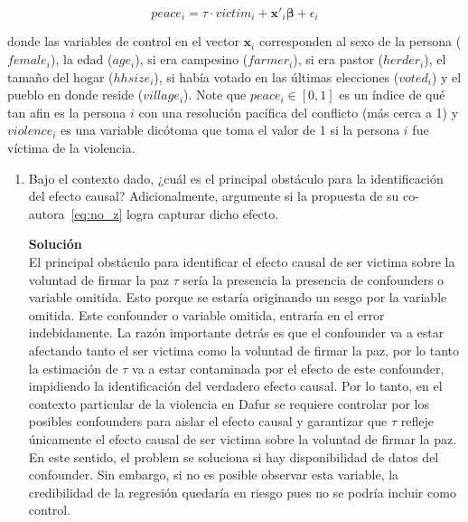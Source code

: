 \documentclass[a4paper, answers, addpoints, 11pt]{exam}
\begin{document}
\begin{equation}\label{eq:no_z}
    peace_i = \tau \cdot victim_i + \textbf{x}'_i\boldsymbol\beta + \epsilon_i
\end{equation}

    donde las variables de control en el vector $\textbf{x}_i$ corresponden al sexo de la persona ($female_i$), la edad ($age_i$), si era campesino ($farmer_i$), si era pastor ($herder_i$), el tamaño del hogar ($hhsize_i$), si había votado en las últimas elecciones ($voted_i$) y el pueblo en donde reside ($village_i$). Note que $peace_i \in [0,1]$ es un índice de qué tan afin es la persona $i$ con una resolución pacífica del conflicto (más cerca a 1) y $violence_i$ es una variable dicótoma que toma el valor de 1 si la persona $i$ fue víctima de la violencia.

\begin{enumerate}
    \item Bajo el contexto dado, ¿cuál es el principal obstáculo para la identificación del efecto causal? Adicionalmente, argumente si la propuesta de su co-autora~\eqref{eq:no_z} logra capturar dicho efecto.
    \begin{mdframed}
        \textbf{Solución}\\
        El principal obstáculo para identificar el efecto causal de ser victima sobre la voluntad de firmar la paz $\tau$ sería la presencia la presencia de confounders o variable omitida. Esto porque se estaría originando un sesgo por la variable omitida. Este confounder o variable omitida, entraría en el error indebidamente. La razón importante detrás es que el confounder va a estar afectando tanto el ser victima como la voluntad de firmar la paz, por lo tanto la estimación de $\tau$ va a estar contaminada por el efecto de este confounder, impidiendo la identificación del verdadero efecto causal. Por lo tanto, en el contexto particular de la violencia en Dafur se requiere controlar por los posibles confounders para aislar el efecto causal y garantizar que $\tau$ refleje únicamente el efecto causal de ser victima sobre la voluntad de firmar la paz.  En este sentido, el problem se soluciona si hay disponibilidad de datos del confounder. Sin embargo, si no es posible observar esta variable, la credibilidad de la regresión quedaría en riesgo pues no se podría incluir como control.\\


\end{mdframed}
\end{enumerate}
\end{document}
